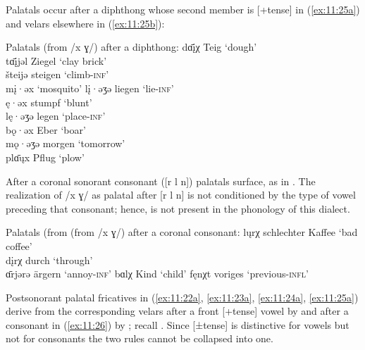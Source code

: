Palatals occur after a diphthong whose second member is [+tense] in (\ref{ex:11:25a}) and velars elsewhere in (\ref{ex:11:25b}):

\ea%
\label{ex:11:25}Palatals (from /x ɣ/) after a diphthong:
\ea\label{ex:11:25a} dɑ̄\k{i}χ \tab [dɑːiç] \tab Teig \tab ‘dough’ \\
    tɑ̄\k{i}jəl \tab [tɑːiʝəl] \tab Ziegel \tab ‘clay brick’ \\
    šteijə \tab [ʃteiʝə] \tab steigen \tab ‘climb-\textsc{inf}’ \\
\ex\label{ex:11:25b} m\k{i}·əx \tab [mɪəx] \tab {} \tab ‘mosquito’ 
    l\k{i}·əʒə \tab [lɪəɣə] \tab liegen \tab ‘lie-\textsc{inf}’ \\
    ę·əx \tab [ɛəx] \tab stumpf \tab ‘blunt’ \\
    lę·əʒə \tab [lɛəɣə] \tab legen \tab ‘place-\textsc{inf}’ \\
    bǫ·əx \tab [bɔəx] \tab Eber \tab ‘boar’ \\
    mǫ·əʒə \tab [mɔəɣə] \tab morgen \tab ‘tomorrow’ \\
    plɑ̄ųx \tab [plɑːux] \tab Pflug \tab ‘plow’ 
\z 
\z 

After a coronal sonorant consonant ([r l n]) palatals surface, as in . The realization of /x ɣ/ as palatal after [r l n] is not conditioned by the type of vowel preceding that consonant; hence,  is not present in the phonology of this dialect.

\ea%
\label{ex:11:26}Palatals (from (from /x ɣ/) after a coronal consonant:
\ea\label{ex:11:26a} lųrχ \tab [lʊrç] \tab schlechter Kaffee \tab ‘bad coffee’ \\
    d\k{i}rχ \tab [dɪrç] \tab durch \tab ‘through’ \\
    ɑ̄rjərə \tab [ɑːrʝərə] \tab ärgern \tab ‘annoy-\textsc{inf}’ 
\ex\label{ex:11:26b} bɑlχ \tab [bɑlç] \tab Kind \tab ‘child’ 
\ex\label{ex:11:26c} fęnχt \tab [fɛnçt] \tab voriges \tab ‘previous-\textsc{infl}’ 
\z 
\z 

Postsonorant palatal fricatives in (\ref{ex:11:22a}, \ref{ex:11:23a}, \ref{ex:11:24a}, \ref{ex:11:25a}) derive from the corresponding velars after a front [+tense] vowel by  and after a consonant in (\ref{ex:11:26}) by ; recall . Since [±tense] is distinctive for vowels but not for consonants the two rules cannot be collapsed into one.

